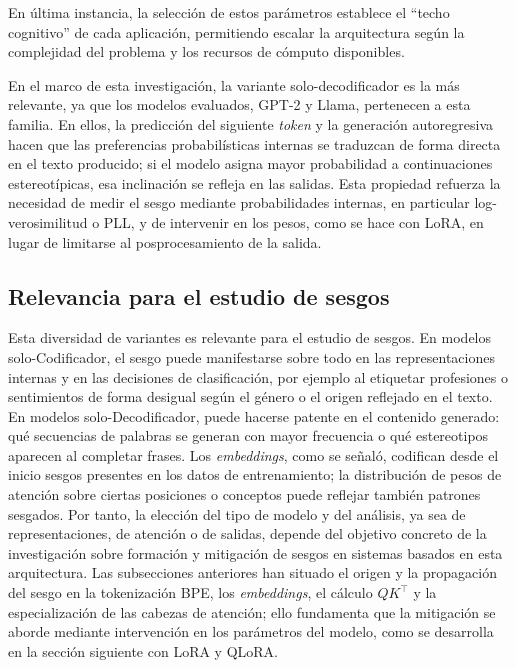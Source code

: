 \documentclass[12pt,a4paper]{report}
\begin{document}
En última instancia, la selección de estos parámetros establece el ``techo cognitivo'' de cada aplicación, permitiendo escalar la arquitectura según la complejidad del problema y los recursos de cómputo disponibles.

En el marco de esta investigación, la variante solo-decodificador es la más relevante, ya que los modelos evaluados, GPT-2 y Llama, pertenecen a esta familia. En ellos, la predicción del siguiente \textit{token} y la generación autoregresiva hacen que las preferencias probabilísticas internas se traduzcan de forma directa en el texto producido; si el modelo asigna mayor probabilidad a continuaciones estereotípicas, esa inclinación se refleja en las salidas. Esta propiedad refuerza la necesidad de medir el sesgo mediante probabilidades internas, en particular log-verosimilitud o PLL, y de intervenir en los pesos, como se hace con LoRA, en lugar de limitarse al posprocesamiento de la salida.

\subsection{Relevancia para el estudio de sesgos}
\label{subsec:relevancia_sesgos_transformer}

Esta diversidad de variantes es relevante para el estudio de sesgos. En modelos solo-Codificador, el sesgo puede manifestarse sobre todo en las representaciones internas 
y en las decisiones de clasificación, por ejemplo al etiquetar profesiones o sentimientos de forma desigual según el género o el origen reflejado en el texto. 
En modelos solo-Decodificador, puede hacerse patente en el contenido generado: qué secuencias de palabras se generan con mayor frecuencia o qué estereotipos aparecen al completar frases. 
Los \textit{embeddings}, como se señaló, codifican desde el inicio sesgos presentes en los datos de entrenamiento; la distribución de pesos de atención sobre ciertas posiciones o conceptos puede reflejar también patrones sesgados. Por tanto, la elección del tipo de modelo y del análisis, ya sea de representaciones, de atención o de salidas, depende del objetivo concreto de la investigación sobre formación y mitigación de sesgos en sistemas basados en esta arquitectura. Las subsecciones anteriores han situado el origen y la propagación del sesgo en la tokenización BPE, los \textit{embeddings}, el cálculo $QK^\top$ y la especialización de las cabezas de atención; ello fundamenta que la mitigación se aborde mediante intervención en los parámetros del modelo, como se desarrolla en la sección siguiente con LoRA y QLoRA.
\end{document}
